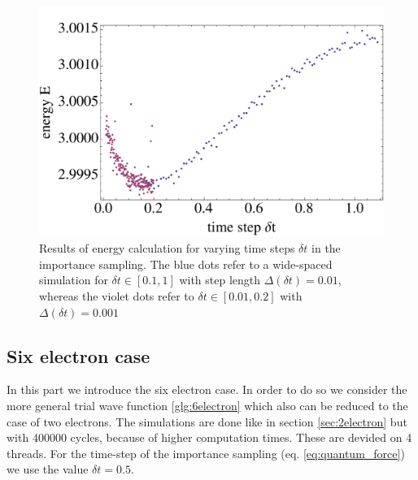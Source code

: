 \begin{figure}[htbp]
    \centering
    \includegraphics[scale=0.6]{importance}
    \caption{Results of energy calculation for varying time steps $\delta t$ in the importance sampling. The blue dots refer to a wide-spaced simulation for $\delta t \in [0.1,1]$ with step length $\Delta (\delta t) = 0.01$, whereas the violet dots refer to $\delta t\in [0.01,0.2]$ with $\Delta(\delta t) = 0.001$}
    \label{fig:importance}
\end{figure}
\FloatBarrier

\subsection{Six electron case}
In this part we introduce the six electron case. In order to do so we consider the more general trial wave function \ref{glg:6electron} which also can be reduced to the case of two electrons. The simulations are done like in section \ref{sec:2electron} but with $400000$ cycles, because of higher computation times. These are devided on 4 threads. For the time-step of the importance sampling (eq. \ref{eq:quantum_force}) we use the value $\delta t = 0.5$. 

